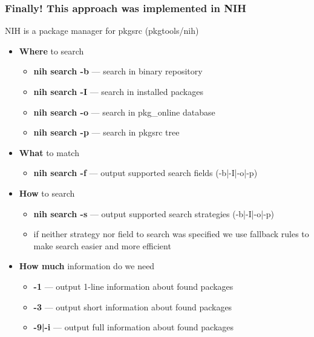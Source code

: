 \documentclass[hyperref=unicode,ascii,xcolor=dvipsnames]{beamer}
\begin{document}

\begin{frame}[fragile]
  \frametitle{Finally! This approach was implemented in NIH}
NIH is a package manager for pkgsrc (pkgtools/nih)
\begin{itemize}
\item {\bf Where} to search
  \begin{itemize}
  \item {\bf nih search -b} --- search in binary repository
  \item {\bf nih search -I} --- search in installed packages
  \item {\bf nih search -o} --- search in pkg\_online database
  \item {\bf nih search -p} --- search in pkgsrc tree
  \end{itemize}
\item {\bf What} to match
  \begin{itemize}
  \item {\bf nih search -f} --- output supported search fields (-b|-I|-o|-p)
  \end{itemize}
\item {\bf How} to search
  \begin{itemize}
  \item {\bf nih search -s} --- output supported search strategies (-b|-I|-o|-p)
  \item if neither strategy nor field to search was specified we use
    fallback rules to make search easier and more efficient
  \end{itemize}
\item {\bf How much} information do we need
  \begin{itemize}
  \item {\bf -1} --- output 1-line information about found packages
  \item {\bf -3} --- output short information about found packages
  \item {\bf -9|-i} --- output full information about found packages
  \end{itemize}
\end{itemize}
\end{frame}

\end{document}

